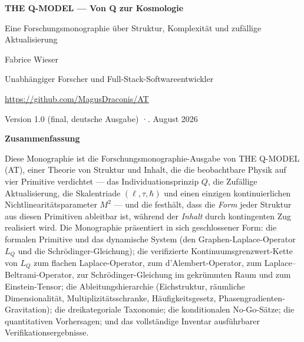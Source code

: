 \documentclass[10pt,twoside,openany]{book}
\begin{document}

\frontmatter

\begin{center}
{\LARGE\bfseries THE Q-MODEL — Von Q zur Kosmologie\par}
\vspace{0.4em}
{\large Eine Forschungsmonographie über Struktur, Komplexität und zufällige Aktualisierung\par}
\vspace{1.0em}
{\normalsize Fabrice Wieser\par}
{\small Unabhängiger Forscher und Full-Stack-Softwareentwickler\par}
{\small \url{https://github.com/MagusDraconis/AT}\par}
\vspace{0.5em}
{\normalsize Version 1.0 (final, deutsche Ausgabe) \quad·. August 2026\par}
\end{center}

\vspace{0.8em}

{\centering\Large\bfseries Zusammenfassung\par}
\vspace{0.3em}
\noindent
Diese Monographie ist die Forschungsmonographie-Ausgabe von THE Q-MODEL (AT), einer
Theorie von Struktur und Inhalt, die die beobachtbare Physik auf vier Primitive verdichtet
--- das Individuationsprinzip $Q$, die Zufällige Aktualisierung, die Skalentriade
$(\ell,\tau,\hbar)$ und einen einzigen kontinuierlichen Nichtlinearitätsparameter $M^2$ ---
und die festhält, dass die \emph{Form} jeder Struktur aus diesen Primitiven ableitbar ist,
während der \emph{Inhalt} durch kontingenten Zug realisiert wird. Die Monographie
präsentiert in sich geschlossener Form: die formalen Primitive und das dynamische System
(den Graphen-Laplace-Operator $L_Q$ und die Schr\"odinger-Gleichung); die verifizierte
Kontinuumsgrenzwert-Kette von $L_Q$ zum flachen Laplace-Operator, zum d'Alembert-Operator,
zum Laplace--Beltrami-Operator, zur Schr\"odinger-Gleichung im gekrümmten Raum und zum
Einstein-Tensor; die Ableitungshierarchie (Eichstruktur, räumliche Dimensionalität,
Multiplizitätsschranke, Häufigkeitsgesetz, Phasengradienten-Gravitation); die
dreikategoriale Taxonomie; die konditionalen No-Go-Sätze; die quantitativen Vorhersagen;
und das vollständige Inventar ausführbarer Verifikationsergebnisse.
\end{document}
